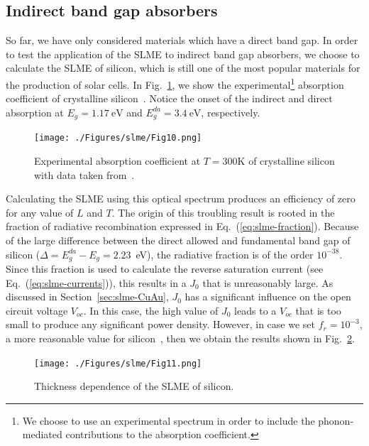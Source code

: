 \begin{refsection}
\subsection{Indirect band gap absorbers} 
 
So far, we have only considered materials which have a direct band gap. In 
order to test the application of the SLME to indirect band gap absorbers, we 
choose to calculate the SLME of silicon, which is still one of the most 
popular materials for the production of solar cells. In 
Fig.~\ref{fig:slme-Si_expAbs}, we show the experimental\footnote{We choose to 
use an experimental spectrum in order to include the phonon-mediated 
contributions to the absorption coefficient.} absorption coefficient of 
crystalline silicon~\cite{green2008}. Notice the onset of the indirect and 
direct absorption at \mbox{$E_g = 1.17~\si{\electronvolt}$} and 
\mbox{$E_g^{da} = 3.4~\si{\electronvolt}$}, respectively. 
 
\begin{figure}[htbp] 
	\centering 
		\texttt{[image: ./Figures/slme/Fig10.png]} 
	\caption{Experimental absorption coefficient at $T = 300\si{\kelvin}$ of 
crystalline silicon with data taken from~\cite{green2008}.} 
	\label{fig:slme-Si_expAbs} 
\end{figure} 
 
Calculating the SLME using this optical spectrum produces an efficiency of 
zero for any value of $L$ and $T$. The origin of this troubling result is 
rooted in the fraction of radiative recombination expressed in 
Eq.~(\ref{eq:slme-fraction}). Because of the large difference between the 
direct allowed and fundamental band gap of silicon ($\Delta = 
E_g^{da}-E_g=2.23$~\si{\electronvolt}), the radiative fraction is of the order 
$10^{-38}$. Since this fraction is used to calculate the reverse saturation 
current (see Eq.~(\ref{eq:slme-currents})), this results in a $J_0$ that is 
unreasonably large. As discussed in Section~\ref{sec:slme-CuAu}, $J_0$ has a 
significant influence on the open circuit voltage $V_{oc}$. In this case, the 
high value of $J_0$ leads to a $V_{oc}$ that is too small to produce any 
significant power density. However, in case we set \mbox{$f_r = 10^{-3}$}, a 
more reasonable value for silicon~\cite{Shockley1952,Trupke2003,Richter2012}, 
then we obtain the results shown in Fig.~\ref{fig:slme-SLME_Si}. 
 
\begin{figure}[htbp] 
	\centering 
		\texttt{[image: ./Figures/slme/Fig11.png]} 
	\caption{Thickness dependence of the SLME of silicon.} 
	\label{fig:slme-SLME_Si} 
\end{figure} 
 

\end{refsection}

